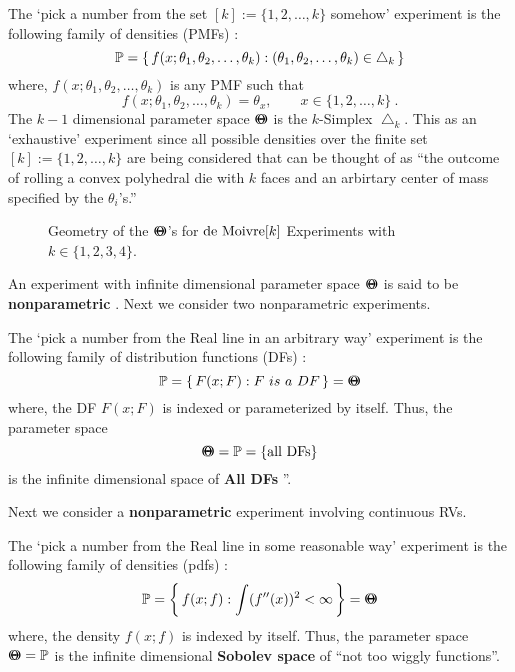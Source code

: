 \begin{Exp}[{de~Moivre[k]}]\label{Exp:GenDiscrete}
The `pick a number from the set $[k] := \{1,2,\ldots,k\}$ somehow' experiment is the following family of densities (PMFs) :
\[
\mathbb{P} = \{ \,  f(x; \theta_1,\theta_2,\ldots,\theta_k) :   (\theta_1,\theta_2,\ldots,\theta_k) \in \bigtriangleup_k \, \} 
\]
where, $f(x; \theta_1,\theta_2,\ldots,\theta_k)$ is any PMF such that 
\[
f(x; \theta_1,\theta_2,\ldots,\theta_k) = \theta_x, \qquad x \in \{1,2,\ldots,k\} \ .
\]
The $k-1$ dimensional parameter space ${\Theta}\mspace{-11 mu}{\Theta}$ is the $k$-Simplex $\bigtriangleup_k$.  This as an `exhaustive' experiment since all possible densities over the finite set $[k] := \{1,2,\ldots,k\}$ are being considered that can be thought of as ``the outcome of rolling a convex polyhedral die with $k$ faces and an arbirtary center of mass specified by the $\theta_i$'s.''
\begin{figure}
\caption{Geometry of the ${\Theta}\mspace{-11 mu}{\Theta}$'s for $\mbox{{\rm de~Moivre}}[k]$ Experiments with $k \in \{1, 2, 3, 4\}$.}
\vspace{5cm}
\end{figure}
\end{Exp}
An experiment with infinite dimensional parameter space ${\Theta}\mspace{-11 mu}{\Theta}$ is said to be {\bf nonparametric} .  Next we consider two nonparametric experiments.
\begin{Exp}\label{Exp:AllDFs}
The `pick a number from the Real line in an arbitrary way' experiment is the following family of distribution functions (DFs) :
\[
\mathbb{P} = \{ \,  F(x; F) :  F~is~a~DF \, \} = {\Theta}\mspace{-11 mu}{\Theta} 
\]
where, the DF $F(x; F)$ is indexed or parameterized by itself. Thus, the parameter space 
\[
{\Theta}\mspace{-11 mu}{\Theta}=\mathbb{P}=\{ \text{all DFs}\}
\]
is the infinite dimensional space of {\bf All DFs} ''.
\end{Exp}
Next we consider a {\bf nonparametric} experiment involving continuous RVs.
\begin{Exp}\label{Exp:Sob}
The `pick a number from the Real line in some reasonable way' experiment is the following family of densities (pdfs) :
\[
\mathbb{P} = \left\{ \,  f(x; f) :  \int(f''(x))^2 < \infty \, \right\} = {\Theta}\mspace{-11 mu}{\Theta} 
\]
where, the density $f(x; f)$ is indexed by itself.  Thus, the parameter space ${\Theta}\mspace{-11 mu}{\Theta}=\mathbb{P}$ is the infinite dimensional {\bf Sobolev space} of ``not too wiggly functions''.
\end{Exp}

